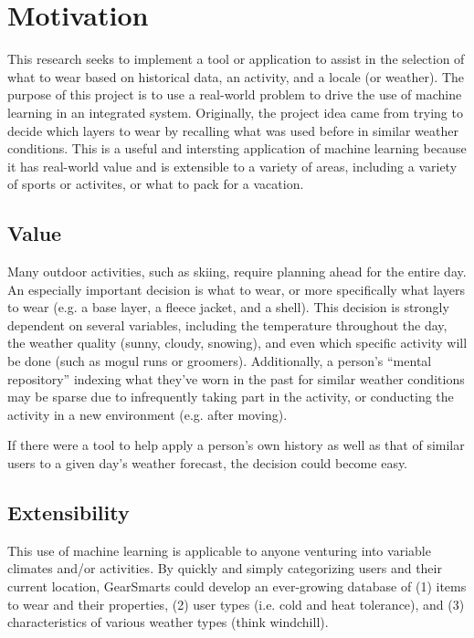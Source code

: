 \section{Motivation}
\label{section:motivation}
This research seeks to implement a tool or application to assist in the selection of what to wear based on
historical data, an activity, and a locale (or weather). The purpose of this project is to use a real-world
problem to drive the use of machine learning in an integrated system. Originally, the project idea came from trying
to decide which layers to wear by recalling what was used before in similar weather conditions. This is a
useful and intersting application of machine learning because it has real-world value and is extensible to a variety
of areas, including a variety of sports or activites, or what to pack for a vacation.

\subsection{Value}
Many outdoor activities, such as skiing, require planning ahead for the entire day. An especially important
decision is what to wear, or more specifically what layers to wear (e.g. a base layer, a fleece jacket, and a shell).
This decision is strongly dependent on several variables, including the temperature throughout the day, the weather
quality (sunny, cloudy, snowing), and even which specific activity will be done (such as mogul runs or groomers).
Additionally, a person's ``mental repository'' indexing what they've worn in the past for similar weather conditions
may be sparse due to infrequently taking part in the activity, or conducting the activity in a new environment (e.g.
after moving).

If there were a tool to help apply a person's own history as well as that of similar users to a given day's weather
forecast, the decision could become easy.

\subsection{Extensibility}
This use of machine learning is applicable to anyone venturing into variable climates and/or activities.
By quickly and simply categorizing
users and their current location, GearSmarts could develop an ever-growing database of (1) items to wear and their properties,
(2) user types (i.e. cold and heat tolerance), and (3) characteristics of various weather types (think windchill).

